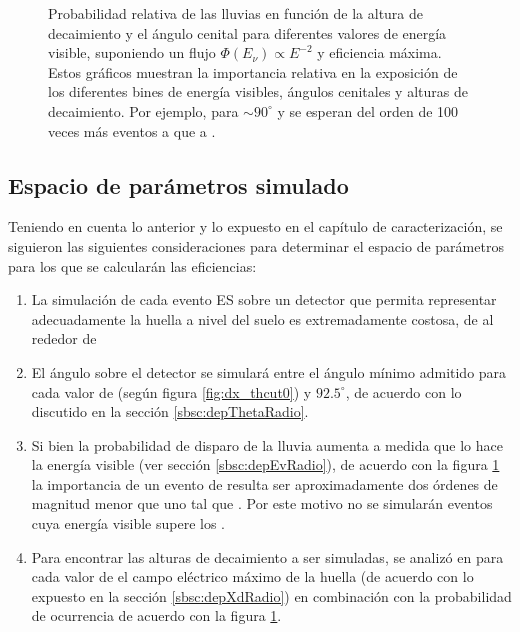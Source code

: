 \begin{figure}[ht!]
		\caption{\label{fig:radioShWeights}
		Probabilidad relativa  de las lluvias en funci\'on de la altura de decaimiento y el \'angulo cenital para diferentes valores de energ\'ia visible, suponiendo un flujo $\Phi(E_\nu)\propto E^{-2}$ y eficiencia m\'axima.
		Estos gr\'aficos muestran la importancia relativa en la exposici\'on de los diferentes bines de energ\'ia visibles, \'angulos cenitales y alturas de decaimiento.
		Por ejemplo, para $\sim90^\circ$ y  se esperan del orden de 100 veces m\'as eventos a  que a .
		}
	\end{figure}
	
	\subsection{Espacio de par\'ametros simulado}
	
	Teniendo en cuenta lo anterior y lo expuesto en el cap\'itulo de caracterizaci\'on, se siguieron las siguientes consideraciones para determinar el espacio de par\'ametros para los que se calcular\'an las eficiencias:
	\begin{enumerate}
		\item La simulaci\'on de cada evento ES sobre un detector que permita representar adecuadamente la huella a nivel del suelo es extremadamente costosa, de al rededor de 
		\item El \'angulo sobre el detector se simular\'a entre el \'angulo m\'inimo admitido para cada valor de \xd{} (seg\'un figura \ref{fig:dx_thcut0}) y $92.5^\circ$, de acuerdo con lo discutido en la secci\'on \ref{sbsc:depThetaRadio}.
		\item Si bien la probabilidad de disparo de la lluvia aumenta a medida que lo hace la energ\'ia visible (ver secci\'on \ref{sbsc:depEvRadio}), de acuerdo con la figura \ref{fig:radioShWeights} la importancia de un evento de  resulta ser aproximadamente dos \'ordenes de magnitud menor que uno tal que . Por este motivo no se simular\'an eventos cuya energ\'ia visible supere los . 
		\item Para encontrar las alturas de decaimiento a ser simuladas, se analiz\'o en para cada valor de \ev{} el campo el\'ectrico m\'aximo de la huella (de acuerdo con lo expuesto en la secci\'on \ref{sbsc:depXdRadio}) en combinaci\'on con la probabilidad de ocurrencia de acuerdo con la figura \ref{fig:radioShWeights}.
	\end{enumerate}
	

